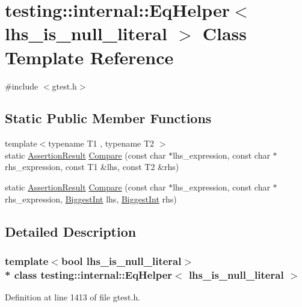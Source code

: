 \hypertarget{classtesting_1_1internal_1_1_eq_helper}{}\section{testing\+:\+:internal\+:\+:Eq\+Helper$<$ lhs\+\_\+is\+\_\+null\+\_\+literal $>$ Class Template Reference}
\label{classtesting_1_1internal_1_1_eq_helper}


{\ttfamily \#include $<$gtest.\+h$>$}

\subsection*{Static Public Member Functions}
\begin{DoxyCompactItemize}
\item 
{\footnotesize template$<$typename T1 , typename T2 $>$ }\\static \hyperlink{classtesting_1_1_assertion_result}{Assertion\+Result} \hyperlink{classtesting_1_1internal_1_1_eq_helper_ae3572c7374534a916b9117efaa89f33f}{Compare} (const char $\ast$lhs\+\_\+expression, const char $\ast$rhs\+\_\+expression, const T1 \&lhs, const T2 \&rhs)
\item 
static \hyperlink{classtesting_1_1_assertion_result}{Assertion\+Result} \hyperlink{classtesting_1_1internal_1_1_eq_helper_aaa42c0059bb3dcc43d556243febb5f1c}{Compare} (const char $\ast$lhs\+\_\+expression, const char $\ast$rhs\+\_\+expression, \hyperlink{namespacetesting_1_1internal_a05c6bd9ede5ccdf25191a590d610dcc6}{Biggest\+Int} lhs, \hyperlink{namespacetesting_1_1internal_a05c6bd9ede5ccdf25191a590d610dcc6}{Biggest\+Int} rhs)
\end{DoxyCompactItemize}


\subsection{Detailed Description}
\subsubsection*{template$<$bool lhs\+\_\+is\+\_\+null\+\_\+literal$>$\\*
class testing\+::internal\+::\+Eq\+Helper$<$ lhs\+\_\+is\+\_\+null\+\_\+literal $>$}



Definition at line 1413 of file gtest.\+h.



